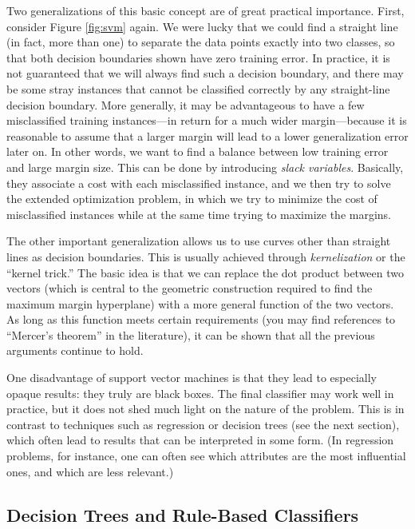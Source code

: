 Two generalizations of this basic concept are of great practical
importance. First, consider Figure \ref{fig:svm} again. We were lucky
that we could find a straight line (in fact, more than one) to
separate the data points exactly into two classes, so that both
decision boundaries shown have zero training error.  In practice, it
is not guaranteed that we will always find such a decision boundary,
and there may be some stray instances that cannot be classified
correctly by any straight-line decision boundary. More generally, it
may be advantageous to have a few misclassified training
instances---in return for a much wider margin---\break because it is
reasonable to assume that a larger margin will lead to a lower
generalization error later on. In other words, we want to find a
balance between low training error and large margin size.  This can be
done by introducing \emph{slack variables}.  Basically, they associate
a cost with each misclassified instance, and we then try to solve the
extended optimization problem, in which we try to minimize the cost of
misclassified instances while at the same time trying to maximize the
margins.

The other important generalization allows us to use curves other than
straight lines as decision boundaries. This is usually achieved
through \emph{kernelization}  or the ``kernel trick.'' The basic idea
is that we can replace the dot product between two vectors (which is
central to the geometric construction required to find the maximum
margin hyperplane) with a more general function of the two vectors. As
long as this function meets certain requirements (you may find
references to ``Mercer's theorem'' in  the literature), it can be shown
that all the previous arguments continue to hold.

One disadvantage of support vector machines is that they lead to
especially opaque results: they truly are black boxes. The final
classifier may work well in practice, but it does not shed much light
on the nature of the problem. This is in contrast to techniques such
as regression or decision trees (see the next section), which often
lead to results that can be interpreted in some form.  (In regression
problems, for instance, one can often see which attributes are the
most influential ones, and which are less relevant.) 


\subsection{Decision Trees and Rule-Based Classifiers}

